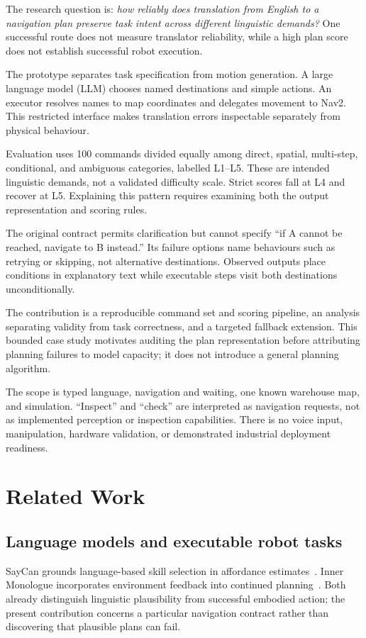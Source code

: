 \documentclass[journal]{IEEEtran}
\begin{document}
The research question is: \emph{how reliably does translation from English to a navigation plan preserve task intent across different linguistic demands?} One successful route does not measure translator reliability, while a high plan score does not establish successful robot execution.

The prototype separates task specification from motion generation. A large language model (LLM) chooses named destinations and simple actions. An executor resolves names to map coordinates and delegates movement to Nav2. This restricted interface makes translation errors inspectable separately from physical behaviour.

Evaluation uses 100 commands divided equally among direct, spatial, multi-step, conditional, and ambiguous categories, labelled L1--L5. These are intended linguistic demands, not a validated difficulty scale. Strict scores fall at L4 and recover at L5. Explaining this pattern requires examining both the output representation and scoring rules.

The original contract permits clarification but cannot specify ``if A cannot be reached, navigate to B instead.'' Its failure options name behaviours such as retrying or skipping, not alternative destinations. Observed outputs place conditions in explanatory text while executable steps visit both destinations unconditionally.

The contribution is a reproducible command set and scoring pipeline, an analysis separating validity from task correctness, and a targeted fallback extension. This bounded case study motivates auditing the plan representation before attributing planning failures to model capacity; it does not introduce a general planning algorithm.

The scope is typed language, navigation and waiting, one known warehouse map, and simulation. ``Inspect'' and ``check'' are interpreted as navigation requests, not as implemented perception or inspection capabilities. There is no voice input, manipulation, hardware validation, or demonstrated industrial deployment readiness.

\section{Related Work}
\subsection{Language models and executable robot tasks}
SayCan grounds language-based skill selection in affordance estimates~\cite{ahn2022saycan}. Inner Monologue incorporates environment feedback into continued planning~\cite{huang2022inner}. Both already distinguish linguistic plausibility from successful embodied action; the present contribution concerns a particular navigation contract rather than discovering that plausible plans can fail.
\end{document}
